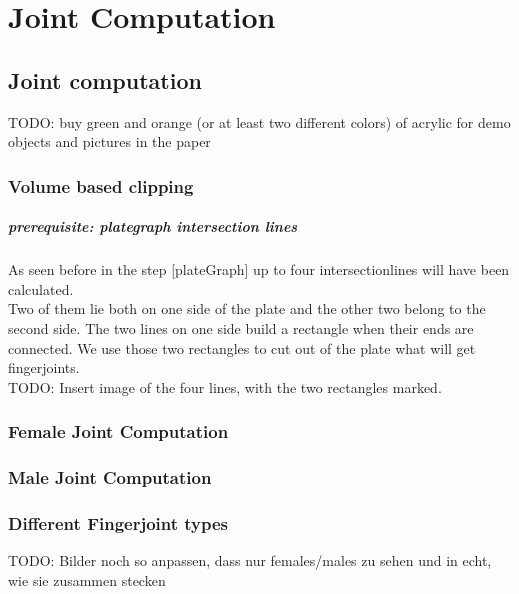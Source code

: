 \documentclass[../ClassicThesis.tex]{subfiles}
\begin{document}
\chapter{Joint Computation}\label{ch:joints}


\section{Joint computation}
TODO: buy green and orange (or at least two different colors) of acrylic for demo objects and pictures in the paper

\subsection{Volume based clipping}
\paragraph{prerequisite: plategraph intersection lines}
As seen before in the step [plateGraph] up to four intersectionlines will have been calculated.\\
Two of them lie both on one side of the plate and the other two belong to the second side. The two lines on one side build a rectangle when their ends are connected. We use those two rectangles to cut out of the plate what will get fingerjoints.\\
TODO: Insert image of the four lines, with the two rectangles marked.


\subsection{Female Joint Computation}
\subsection{Male Joint Computation}

\subsection{Different Fingerjoint types}
TODO: Bilder noch so anpassen, dass nur females/males zu sehen und in echt, wie sie zusammen stecken
\end{document}
